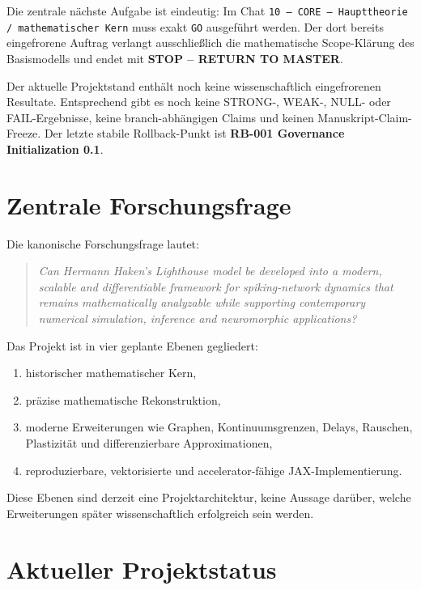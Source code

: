 \documentclass[11pt,a4paper]{article}
\begin{document}
Die zentrale nächste Aufgabe ist eindeutig: Im Chat \texttt{10 -- CORE -- Haupttheorie / mathematischer Kern} muss exakt \texttt{GO} ausgeführt werden. Der dort bereits eingefrorene Auftrag verlangt ausschließlich die mathematische Scope-Klärung des Basismodells und endet mit \textbf{STOP -- RETURN TO MASTER}.

Der aktuelle Projektstand enthält noch keine wissenschaftlich eingefrorenen Resultate. Entsprechend gibt es noch keine STRONG-, WEAK-, NULL- oder FAIL-Ergebnisse, keine branch-abhängigen Claims und keinen Manuskript-Claim-Freeze. Der letzte stabile Rollback-Punkt ist \textbf{RB-001 Governance Initialization 0.1}.

\section{Zentrale Forschungsfrage}

Die kanonische Forschungsfrage lautet:

\begin{quote}
\textit{Can Hermann Haken's Lighthouse model be developed into a modern, scalable and differentiable framework for spiking-network dynamics that remains mathematically analyzable while supporting contemporary numerical simulation, inference and neuromorphic applications?}
\end{quote}

Das Projekt ist in vier geplante Ebenen gegliedert:
\begin{enumerate}
\item historischer mathematischer Kern,
\item präzise mathematische Rekonstruktion,
\item moderne Erweiterungen wie Graphen, Kontinuumsgrenzen, Delays, Rauschen, Plastizität und differenzierbare Approximationen,
\item reproduzierbare, vektorisierte und accelerator-fähige JAX-Implementierung.
\end{enumerate}

Diese Ebenen sind derzeit eine Projektarchitektur, keine Aussage darüber, welche Erweiterungen später wissenschaftlich erfolgreich sein werden.

\section{Aktueller Projektstatus}
\end{document}
